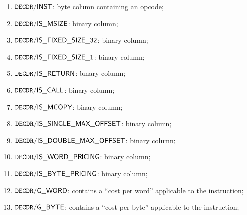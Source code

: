 \begin{enumerate}
	\item $\texttt{DECDR}\textsf{/}{\textsf{INST}}$:
		byte column containing an opcode;
	\item $\texttt{DECDR}\textsf{/}{\textsf{IS\_MSIZE}}$:
		binary column;
	\item $\texttt{DECDR}\textsf{/}{\textsf{IS\_FIXED\_SIZE\_32}}$:
		binary column;
	\item $\texttt{DECDR}\textsf{/}{\textsf{IS\_FIXED\_SIZE\_1}}$:
		binary column;
	\item $\texttt{DECDR}\textsf{/}{\textsf{IS\_RETURN}}$:
		binary column;
	\item $\texttt{DECDR}\textsf{/}{\textsf{IS\_CALL}}$:
		binary column;
	\item $\texttt{DECDR}\textsf{/}{\textsf{IS\_MCOPY}}$:
		binary column;
	\item $\texttt{DECDR}\textsf{/}{\textsf{IS\_SINGLE\_MAX\_OFFSET}}$:
		binary column;
	\item $\texttt{DECDR}\textsf{/}{\textsf{IS\_DOUBLE\_MAX\_OFFSET}}$:
		binary column;
	\item $\texttt{DECDR}\textsf{/}{\textsf{IS\_WORD\_PRICING}}$:
		binary column;
	\item $\texttt{DECDR}\textsf{/}{\textsf{IS\_BYTE\_PRICING}}$:
		binary column;
	\item $\texttt{DECDR}\textsf{/}{\textsf{G\_WORD}}$:
		contains a ``cost per \evm{} word'' applicable to the instruction;
	\item $\texttt{DECDR}\textsf{/}{\textsf{G\_BYTE}}$:
		contains a ``cost per \evm{} byte'' applicable to the instruction;
\end{enumerate}
